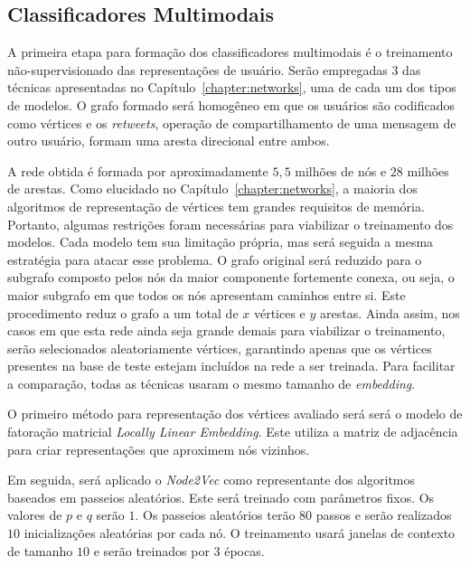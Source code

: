 \subsection{Classificadores Multimodais}
\label{sec:multimodal-classifier}


A primeira etapa para formação dos classificadores multimodais é o treinamento
não-supervisionado das representações de usuário.
Serão empregadas 3 das técnicas apresentadas no Capítulo~\ref{chapter:networks},
uma de cada um dos tipos de modelos.
O grafo formado será homogêneo em que os usuários são codificados como vértices
e os \textit{retweets}, operação de compartilhamento de uma mensagem de outro
usuário, formam uma aresta direcional entre ambos.

A rede obtida é formada por aproximadamente $5,5$ milhões de nós e $28$ milhões
de arestas.
Como elucidado no Capítulo~\ref{chapter:networks}, a maioria dos algoritmos de
representação de vértices tem grandes requisitos de memória.
Portanto, algumas restrições foram necessárias para viabilizar o treinamento dos
modelos.
Cada modelo tem sua limitação própria, mas será seguida a mesma estratégia para
atacar esse problema.
O grafo original será reduzido para o subgrafo composto pelos nós da maior
componente fortemente conexa, ou seja, o maior subgrafo em que todos os nós
apresentam caminhos entre si.
Este procedimento reduz o grafo a um total de $x$ vértices e $y$ arestas.
Ainda assim, nos casos em que esta rede ainda seja grande demais para viabilizar
o treinamento, serão selecionados aleatoriamente vértices, garantindo apenas que
os vértices presentes na base de teste estejam incluídos na rede a ser treinada.
Para facilitar a comparação, todas as técnicas usaram o mesmo tamanho de
\textit{embedding}.

O primeiro método para representação dos vértices avaliado será será o modelo de
fatoração matricial \textit{Locally Linear Embedding}.
Este utiliza a matriz de adjacência para criar representações que aproximem nós
vizinhos.

Em seguida, será aplicado o \textit{Node2Vec} como representante dos algoritmos baseados
em passeios aleatórios.
Este será treinado com parâmetros fixos.
Os valores de $p$ e $q$ serão $1$.
Os passeios aleatórios terão $80$ passos e serão realizados $10$ inicializações
aleatórias por cada nó.
O treinamento usará janelas de contexto de tamanho $10$ e serão treinados por
$3$ épocas.

